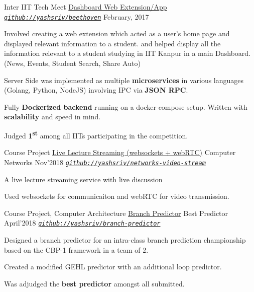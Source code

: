 
\begin{cventries}

  \cventry
  {Inter IIT Tech Meet}
  {\href{https://github.com/yashsriv/beethoven}{Dashboard Web Extension/App}}
  {\emph{\texttt{\href{https://github.com/yashsriv/beethoven}{github://yashsriv/beethoven}}}}
  {February, 2017}
  {
    \begin{cvitems}
    \item Involved creating a web extension which acted as a user’s home page
      \ifdefined \ONEPAGE and displayed relevant information to a student. \else
      and helped display all the information relevant to a student studying in
      IIT Kanpur in a main Dashboard. (News, Events, Student Search, Share Auto)
      \fi
    \item Server Side was implemented as multiple \textbf{microservices} in
      various languages \ifdefined \ONEPAGE \else (Golang, Python, NodeJS) \fi
      involving IPC via \textbf{JSON RPC}.
    \item Fully \textbf{Dockerized backend} running on a docker-compose setup.
      Written with \textbf{scalability} and speed in mind.
    \item Judged \textbf{1\textsuperscript{st}} among all IITs participating
      in the competition.
    \end{cvitems}
  }

  \smallcventry
  {Course Project}
  {\href{https://github.com/yashsriv/networks-video-stream}{Live Lecture Streaming (websockets + webRTC)}}
  {Computer Networks}
  {Nov'2018}
  {\emph{\texttt{\href{https://github.com/yashsriv/networks-video-stream}{github://yashsriv/networks-video-stream}}}}
  {
    \begin{cvitems}
    \item A live lecture streaming service with live discussion
    \item Used websockets for communicaiton and webRTC for video transmission.
    \end{cvitems}
  }

  \smallcventry
  {Course Project, Computer Architecture}
  {\href{https://github.com/yashsriv/branch-predictor/blob/master/report/main.pdf}{Branch Predictor}}
  {Best Predictor}
  {April'2018}
  {\emph{\texttt{\href{https://github.com/yashsriv/branch-predictor/blob/master/report/main.pdf}{github://yashsriv/branch-predictor}}}}
  {
    \begin{cvitems}
    \item Designed a branch predictor for an intra-class branch prediction
      championship based on the CBP-1 framework in a team of 2.
    \item Created a modified GEHL predictor with an additional loop predictor.
    \item Was adjudged the \textbf{best predictor} amongst all submitted.
    \end{cvitems}
  }


\end{cventries}
